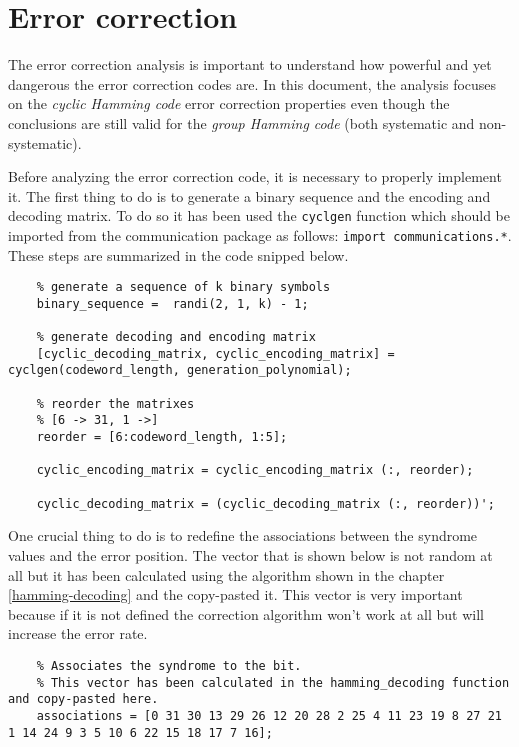 \vspace{40px} \section{Error correction}
The error correction analysis is important to understand how powerful and yet dangerous the error correction codes are. In this document, the analysis focuses on the \textsl{cyclic Hamming code} error correction properties even though the conclusions are still valid for the \textsl{group Hamming code} (both systematic and non-systematic). 

Before analyzing the error correction code, it is necessary to properly implement it. The first thing to do is to generate a binary sequence and the encoding and decoding matrix. To do so it has been used the \texttt{cyclgen} function which should be imported from the communication package as follows: \texttt{import communications.*}. These steps are summarized in the code snipped below.

\begin{lstlisting} 
    % generate a sequence of k binary symbols
    binary_sequence =  randi(2, 1, k) - 1;

    % generate decoding and encoding matrix
    [cyclic_decoding_matrix, cyclic_encoding_matrix] = cyclgen(codeword_length, generation_polynomial);

    % reorder the matrixes
    % [6 -> 31, 1 ->]
    reorder = [6:codeword_length, 1:5];

    cyclic_encoding_matrix = cyclic_encoding_matrix (:, reorder); 

    cyclic_decoding_matrix = (cyclic_decoding_matrix (:, reorder))'; 
\end{lstlisting}

\noindent One crucial thing to do is to redefine the associations between the syndrome values and the error position. The vector that is shown below is not random at all but it has been calculated using the algorithm shown in the chapter \ref{hamming-decoding} and the copy-pasted it. This vector is very important because if it is not defined the correction algorithm won't work at all but will increase the error rate.

\begin{lstlisting} 
    % Associates the syndrome to the bit.
    % This vector has been calculated in the hamming_decoding function and copy-pasted here.
    associations = [0 31 30 13 29 26 12 20 28 2 25 4 11 23 19 8 27 21 1 14 24 9 3 5 10 6 22 15 18 17 7 16];
\end{lstlisting} 

